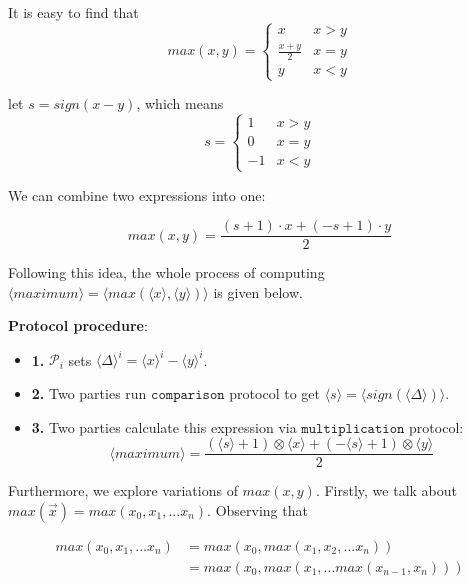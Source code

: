 \documentclass[letterpaper]{article} %
\begin{document}
       It is easy to find that
       $$max(x,y) = \left\{\begin{matrix}
           x & x>y\\
           \frac{x+ y}{2} & x=y\\
           y & x<y
           \end{matrix}\right.$$

       let $s = sign(x-y)$, which means
       $$s = \left\{\begin{matrix}
           1 & x>y\\
           0 & x=y\\
           -1 & x<y
           \end{matrix}\right.$$

       We can combine two expressions into one:

       $$max(x,y) = \frac{(s+1)\cdot x+ (-s+1)\cdot y}{2}$$


       Following this idea, the whole process of computing $\langle maximum\rangle  = \langle max(\langle x\rangle,\langle y\rangle)\rangle$ is given below.

       \textbf{Protocol procedure}:
       \begin{itemize}
           \item \textbf{1.} $\mathcal{P}_{i}$ sets $\langle \Delta \rangle^{i}=\langle x\rangle ^{i}-\langle y\rangle ^{i}$.
           \item \textbf{2.} Two parties run $\mathtt{comparison}$ protocol to get $\langle s\rangle =\langle sign(\langle \Delta \rangle)\rangle$.%
           \item \textbf{3.} Two parties calculate this expression via $\mathtt{multiplication}$ protocol:
           $$\langle maximum\rangle=\frac{(\langle s\rangle+1)\otimes \langle x\rangle+ (-\langle s\rangle+1)\otimes \langle y\rangle}{2}$$
       \end{itemize}

       Furthermore, we explore variations of $max(x,y)$.
       Firstly, we talk about $max(\overrightarrow{x})=max(x_{0},x_{1},...x_{n})$. Observing that

       \begin{align*}
           max(x_{0},x_{1},...x_{n}) &= max(x_{0},max(x_{1},x_{2},...x_{n})) \\
         &= max(x_{0},max(x_{1},...max(x_{n-1},x_{n})))
       \end{align*}
\end{document}
